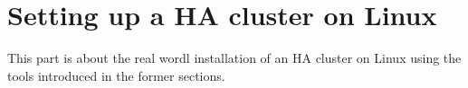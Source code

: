 \section{Setting up a HA cluster on Linux}
This part is about the real wordl installation of an HA cluster on Linux using the tools introduced in the former sections.

